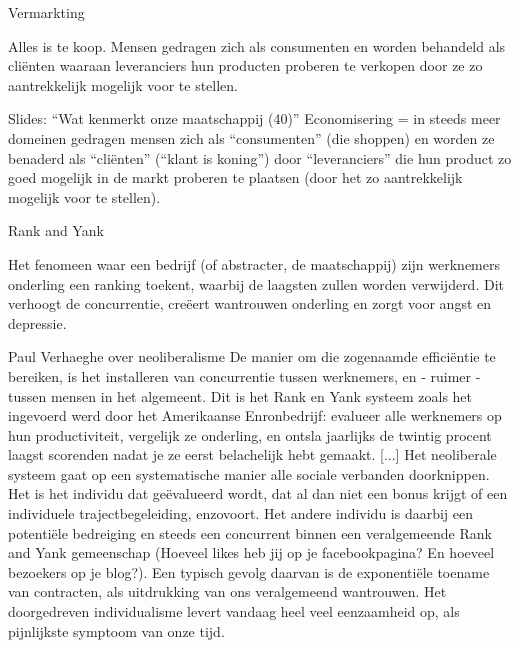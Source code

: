\documentclass[main.tex]{subfiles}
\begin{document}
\begin{examenvraag}
    \begin{vraag}
        Vermarkting
    \end{vraag}

    \begin{antwoord}
    	Alles is te koop.‭ ‬Mensen gedragen zich als consumenten en worden behandeld als cliënten waaraan leveranciers hun producten proberen te verkopen door ze zo aantrekkelijk mogelijk voor te stellen.
        \begin{citaat}{Slides: ``Wat kenmerkt onze maatschappij (40)''}
            Economisering = in steeds meer domeinen gedragen mensen zich als “consumenten” (die shoppen) en worden ze benaderd als “cliënten” (“klant is koning”) door “leveranciers” die hun product zo goed mogelijk in de markt proberen te plaatsen (door het zo aantrekkelijk mogelijk voor te stellen).
        \end{citaat}
    \end{antwoord}
\end{examenvraag}

\begin{examenvraag}
    \begin{vraag}
        Rank and Yank
    \end{vraag}

    \begin{antwoord}
        Het fenomeen waar een bedrijf (of abstracter, de maatschappij) zijn werknemers onderling een ranking toekent, waarbij de laagsten zullen worden verwijderd.
        Dit verhoogt de concurrentie, cre\"eert wantrouwen onderling en zorgt voor angst en depressie.
        \begin{citaat}{Paul Verhaeghe over neoliberalisme}
            De manier om die zogenaamde effici\"entie te bereiken, is het installeren van concurrentie tussen werknemers, en - ruimer - tussen mensen in het algemeent.
            Dit is het Rank en Yank systeem zoals het ingevoerd werd door het Amerikaanse Enronbedrijf: evalueer alle werknemers op hun productiviteit, vergelijk ze onderling, en ontsla jaarlijks de twintig procent laagst scorenden nadat je ze eerst belachelijk hebt gemaakt.
            [...]
            Het neoliberale systeem gaat op een systematische manier alle sociale verbanden doorknippen.
            Het is het individu dat ge\"evalueerd wordt,  dat  al  dan  niet  een  bonus  krijgt  of  een  individuele  trajectbegeleiding,  enzovoort.
            Het  andere individu is daarbij een potentiële bedreiging en steeds een concurrent binnen een veralgemeende Rank and Yank gemeenschap (Hoeveel likes heb jij op je facebookpagina? En hoeveel bezoekers op je blog?).
            Een typisch gevolg daarvan is de exponenti\"ele toename van contracten, als uitdrukking van ons veralgemeend wantrouwen. Het doorgedreven individualisme levert vandaag heel veel eenzaamheid op, als pijnlijkste symptoom van onze tijd.
        \end{citaat}
    \end{antwoord}
\end{examenvraag}
\end{document}
